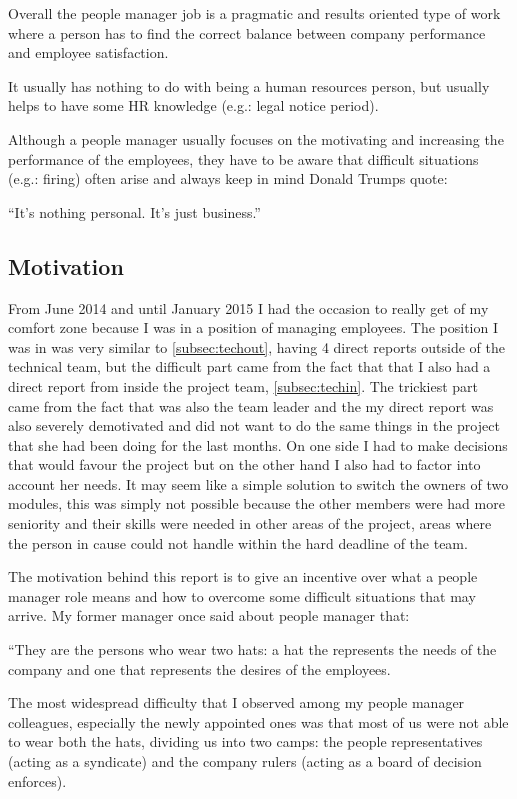 Overall the people manager job is a pragmatic and results oriented type of work where a person has to find the correct balance between company performance and employee satisfaction.

It usually has nothing to do with being a human resources person, but usually helps to have some HR knowledge (e.g.: legal notice period). 

Although a people manager usually focuses on the motivating and increasing the performance of the employees, they have to be aware that difficult situations (e.g.: firing) often arise and always keep in mind Donald Trumps quote:

\begin{displayquote}
``It's nothing personal. It's just business.''
\end{displayquote}

\subsection{Motivation}
\label{subsec:Motivation}

From June 2014 and until January 2015 I had the occasion to really get of my comfort zone because I was in a position of managing employees. The position I was in was very similar to \ref{subsec:techout}, having 4 direct reports outside of the technical team, but the difficult part came from the fact that that I also had a direct report from inside the project team, \ref{subsec:techin}. The trickiest part came from the fact that was also the team leader and the my direct report was also severely demotivated and did not want to do the same things in the project that she had been doing for the last months. On one side I had to make decisions that would favour the project but on the other hand I also had to factor into account her needs. It may seem like a simple solution to switch the owners of two modules, this was simply not possible because the other members were had more seniority and their skills were needed in other areas of the project, areas where the person in cause could not handle within the hard deadline of the team.

The motivation behind this report is to give an incentive over what a people manager role means and how to overcome some difficult situations that may arrive. My former manager once said about people manager that:
\begin{displayquote}
``They are the persons who wear two hats: a hat the represents the needs of the company and one that represents the desires of the employees.
\end{displayquote}
The most widespread difficulty that I observed among my people manager colleagues, especially the newly appointed ones was that most of us were not able to wear both the hats, dividing us into two camps: the people representatives (acting as a syndicate) and the company rulers (acting as a board of decision enforces).

